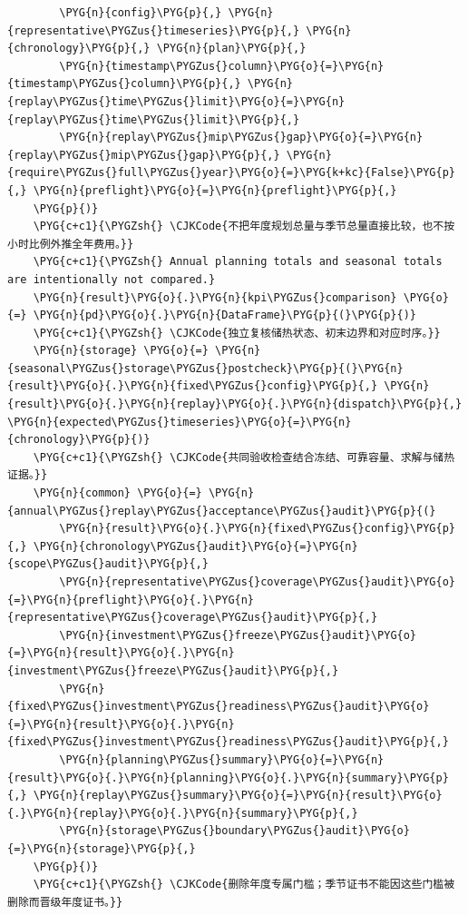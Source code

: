 \begin{Verbatim}
        \PYG{n}{config}\PYG{p}{,} \PYG{n}{representative\PYGZus{}timeseries}\PYG{p}{,} \PYG{n}{chronology}\PYG{p}{,} \PYG{n}{plan}\PYG{p}{,}
        \PYG{n}{timestamp\PYGZus{}column}\PYG{o}{=}\PYG{n}{timestamp\PYGZus{}column}\PYG{p}{,} \PYG{n}{replay\PYGZus{}time\PYGZus{}limit}\PYG{o}{=}\PYG{n}{replay\PYGZus{}time\PYGZus{}limit}\PYG{p}{,}
        \PYG{n}{replay\PYGZus{}mip\PYGZus{}gap}\PYG{o}{=}\PYG{n}{replay\PYGZus{}mip\PYGZus{}gap}\PYG{p}{,} \PYG{n}{require\PYGZus{}full\PYGZus{}year}\PYG{o}{=}\PYG{k+kc}{False}\PYG{p}{,} \PYG{n}{preflight}\PYG{o}{=}\PYG{n}{preflight}\PYG{p}{,}
    \PYG{p}{)}
    \PYG{c+c1}{\PYGZsh{} \CJKCode{不把年度规划总量与季节总量直接比较，也不按小时比例外推全年费用。}}
    \PYG{c+c1}{\PYGZsh{} Annual planning totals and seasonal totals are intentionally not compared.}
    \PYG{n}{result}\PYG{o}{.}\PYG{n}{kpi\PYGZus{}comparison} \PYG{o}{=} \PYG{n}{pd}\PYG{o}{.}\PYG{n}{DataFrame}\PYG{p}{(}\PYG{p}{)}
    \PYG{c+c1}{\PYGZsh{} \CJKCode{独立复核储热状态、初末边界和对应时序。}}
    \PYG{n}{storage} \PYG{o}{=} \PYG{n}{seasonal\PYGZus{}storage\PYGZus{}postcheck}\PYG{p}{(}\PYG{n}{result}\PYG{o}{.}\PYG{n}{fixed\PYGZus{}config}\PYG{p}{,} \PYG{n}{result}\PYG{o}{.}\PYG{n}{replay}\PYG{o}{.}\PYG{n}{dispatch}\PYG{p}{,} \PYG{n}{expected\PYGZus{}timeseries}\PYG{o}{=}\PYG{n}{chronology}\PYG{p}{)}
    \PYG{c+c1}{\PYGZsh{} \CJKCode{共同验收检查结合冻结、可靠容量、求解与储热证据。}}
    \PYG{n}{common} \PYG{o}{=} \PYG{n}{annual\PYGZus{}replay\PYGZus{}acceptance\PYGZus{}audit}\PYG{p}{(}
        \PYG{n}{result}\PYG{o}{.}\PYG{n}{fixed\PYGZus{}config}\PYG{p}{,} \PYG{n}{chronology\PYGZus{}audit}\PYG{o}{=}\PYG{n}{scope\PYGZus{}audit}\PYG{p}{,}
        \PYG{n}{representative\PYGZus{}coverage\PYGZus{}audit}\PYG{o}{=}\PYG{n}{preflight}\PYG{o}{.}\PYG{n}{representative\PYGZus{}coverage\PYGZus{}audit}\PYG{p}{,}
        \PYG{n}{investment\PYGZus{}freeze\PYGZus{}audit}\PYG{o}{=}\PYG{n}{result}\PYG{o}{.}\PYG{n}{investment\PYGZus{}freeze\PYGZus{}audit}\PYG{p}{,}
        \PYG{n}{fixed\PYGZus{}investment\PYGZus{}readiness\PYGZus{}audit}\PYG{o}{=}\PYG{n}{result}\PYG{o}{.}\PYG{n}{fixed\PYGZus{}investment\PYGZus{}readiness\PYGZus{}audit}\PYG{p}{,}
        \PYG{n}{planning\PYGZus{}summary}\PYG{o}{=}\PYG{n}{result}\PYG{o}{.}\PYG{n}{planning}\PYG{o}{.}\PYG{n}{summary}\PYG{p}{,} \PYG{n}{replay\PYGZus{}summary}\PYG{o}{=}\PYG{n}{result}\PYG{o}{.}\PYG{n}{replay}\PYG{o}{.}\PYG{n}{summary}\PYG{p}{,}
        \PYG{n}{storage\PYGZus{}boundary\PYGZus{}audit}\PYG{o}{=}\PYG{n}{storage}\PYG{p}{,}
    \PYG{p}{)}
    \PYG{c+c1}{\PYGZsh{} \CJKCode{删除年度专属门槛；季节证书不能因这些门槛被删除而晋级年度证书。}}

\end{Verbatim}
